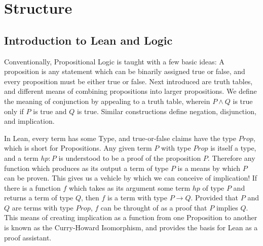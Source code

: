 

\chapter{Structure}

\section{Introduction to Lean and Logic}

Conventionally, Propositional Logic is taught with a few basic ideas:
A proposition is any statement which can be binarily assigned true or 
false, and every proposition must be either true or false. Next introduced 
are truth tables, and different means of combining propositions into 
larger propositions. We define the meaning of conjunction by appealing to 
a truth table, wherein $P\wedge Q$ is true only if $P$ is true and $Q$ is true.
Similar constructions define negation, disjunction, and implication. 

In Lean, every term has some Type, and true-or-false claims have the type 
$\mathit{Prop}$, which is short for Propositions. Any given term $P$ with
type $Prop$ is itself a type, and a term $hp : P$ is understood to be a 
proof of the proposition $P$. Therefore any function which produces as its
output a term of type $P$ is a means by which $P$ can be proven. This gives 
us a vehicle by which we can conceive of implication! If there is a function
$f$ which takes as its argument some term $hp$ of type $P$ and returns
a term of type $Q$, then $f$ is a term with type $P\to Q$. Provided that 
$P$ and $Q$ are terms with type $Prop$, $f$ can be throught of as a proof
that $P$ implies $Q$. This means of creating implication as a function from
one Proposition to another is known as the Curry-Howard Isomorphism, and
provides the basis for Lean as a proof assistant. 

